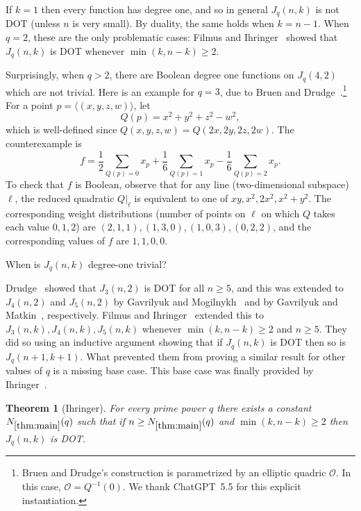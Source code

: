 \documentclass{article}
\newtheorem{theorem}{Theorem}[section]
\theoremstyle{definition}
\providecommand{\Nmain}{N_{\ref{thm:main}}}
\begin{document}
If $k = 1$ then every function has degree one, and so in general $J_q(n,k)$ is not DOT (unless $n$ is very small). By duality, the same holds when $k = n-1$. When $q=2$, these are the only problematic cases: Filmus and Ihringer~\cite{FI19} showed that $J_q(n,k)$ is DOT whenever $\min(k,n-k) \ge 2$. 

Surprisingly, when $q > 2$, there are Boolean degree one functions on $J_q(4,2)$ which are not trivial. Here is an example for $q = 3$, due to Bruen and Drudge~\cite[Corollary 2.1]{BD99}.\footnote{Bruen and Drudge's construction is parametrized by an elliptic quadric $\mathcal{O}$. In this case, $\mathcal{O} = Q^{-1}(0)$. We thank ChatGPT~5.5 for this explicit instantiation.} For a point $p = \langle(x,y,z,w)\rangle$, let
\[
 Q(p) = x^2 + y^2 + z^2 - w^2,
\]
which is well-defined since $Q(x,y,z,w) = Q(2x,2y,2z,2w)$. The counterexample is
\[
 f = \frac{1}{2} \sum_{Q(p) = 0} x_p + \frac{1}{6} \sum_{Q(p) = 1} x_p - \frac{1}{6} \sum_{Q(p) = 2} x_p.
\]
To check that $f$ is Boolean, observe that for any line (two-dimensional subspace) $\ell$, the reduced quadratic $Q|_\ell$ is equivalent to one of $xy,x^2,2x^2,x^2+y^2$. The corresponding weight distributions (number of points on $\ell$ on which $Q$ takes each value $0,1,2$) are $(2,1,1),(1,3,0),(1,0,3),(0,2,2)$, and the corresponding values of $f$ are $1,1,0,0$.

\begin{tcolorbox}[colback=blue!5!white,colframe=blue!75!black]
  When is $J_q(n,k)$ degree-one trivial?
\end{tcolorbox}

Drudge~\cite[Theorem 6.4]{DrudgePhD} showed that $J_3(n,2)$ is DOT for all $n \ge 5$, and this was extended to $J_4(n,2)$ and $J_5(n,2)$ by Gavrilyuk and Mogilnykh~\cite{GM14} and by Gavrilyuk and Matkin~\cite{GM18}, respectively. Filmus and Ihringer~\cite{FI19} extended this to $J_3(n,k),J_4(n,k),J_5(n,k)$ whenever $\min(k,n-k) \ge 2$ and $n \ge 5$. They did so using an inductive argument showing that if $J_q(n,k)$ is DOT then so is $J_q(n+1,k+1)$. 
What prevented them from proving a similar result for other values of $q$ is a missing base case. This base case was finally provided by Ihringer~\cite{Ihr24}.

\begin{theorem}[Ihringer] \label{thm:main}
For every prime power $q$ there exists a constant $\Nmain(q)$ such that if $n \ge \Nmain(q)$ and $\min(k,n-k) \ge 2$ then $J_q(n,k)$ is DOT.
\end{theorem}
\end{document}
